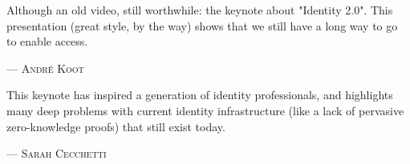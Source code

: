 Although an old video, still worthwhile: the keynote about "Identity 2.0". This presentation (great style, by the way) shows that we still have a long way to go to enable access.
\setlength{\parindent}{0cm}\par\textsc{ --- André Koot }\par\vspace{12pt}\setlength{\parindent}{15pt}
This keynote has inspired a generation of identity professionals, and highlights many deep problems with current identity infrastructure (like a lack of pervasive zero-knowledge proofs) that still exist today. 
\setlength{\parindent}{0cm}\par\textsc{ --- Sarah Cecchetti }\par\vspace{12pt}\setlength{\parindent}{15pt}
